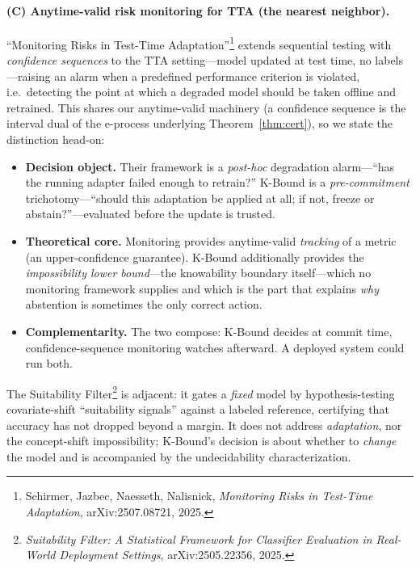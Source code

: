 \paragraph{(C) Anytime-valid risk monitoring for TTA (the nearest neighbor).}
``Monitoring Risks in Test-Time Adaptation''\footnote{Schirmer, Jazbec, Naesseth,
Nalisnick, \emph{Monitoring Risks in Test-Time Adaptation}, arXiv:2507.08721, 2025.}
extends sequential testing with \emph{confidence sequences} to the TTA setting---model
updated at test time, no labels---raising an alarm when a predefined performance
criterion is violated, i.e.\ detecting the point at which a degraded model should be
taken offline and retrained. This shares our anytime-valid machinery (a confidence
sequence is the interval dual of the e-process underlying
Theorem~\ref{thm:cert}), so we state the distinction head-on:
\begin{itemize}
  \item \textbf{Decision object.} Their framework is a \emph{post-hoc} degradation
  alarm---``has the running adapter failed enough to retrain?'' K-Bound is a
  \emph{pre-commitment} trichotomy---``should this adaptation be applied at all; if
  not, freeze or abstain?''---evaluated before the update is trusted.
  \item \textbf{Theoretical core.} Monitoring provides anytime-valid \emph{tracking}
  of a metric (an upper-confidence guarantee). K-Bound additionally provides the
  \emph{impossibility lower bound}---the knowability boundary itself---which no
  monitoring framework supplies and which is the part that explains \emph{why}
  abstention is sometimes the only correct action.
  \item \textbf{Complementarity.} The two compose: K-Bound decides at commit time,
  confidence-sequence monitoring watches afterward. A deployed system could run both.
\end{itemize}
The Suitability Filter\footnote{\emph{Suitability Filter: A Statistical Framework for
Classifier Evaluation in Real-World Deployment Settings}, arXiv:2505.22356, 2025.}
is adjacent: it gates a \emph{fixed} model by hypothesis-testing covariate-shift
``suitability signals'' against a labeled reference, certifying that accuracy has not
dropped beyond a margin. It does not address \emph{adaptation}, nor the concept-shift
impossibility; K-Bound's decision is about whether to \emph{change} the model and is
accompanied by the undecidability characterization.


